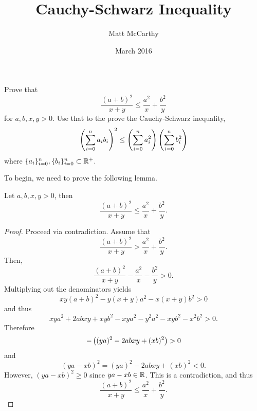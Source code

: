 \documentclass[notitlepage]{simple}
\author{Matt McCarthy}
\title{Cauchy-Schwarz Inequality}
\date{March 2016}
\begin{document}
	\maketitle
	\begin{thm*}
		Prove that
		\[
			\frac{(a+b)^2}{x+y}\leq \frac{a^2}{x}+\frac{b^2}{y}
		\]
		for $a,b,x,y>0$.
		Use that to the prove the Cauchy-Schwarz inequality,
		\[
			\left( \sum_{i=0}^n a_ib_i \right)^2 \leq \left( \sum_{i=0}^n a_i^2 \right)\left( \sum_{i=0}^n b_i^2 \right)
		\]
		where $\lbrace a_i \rbrace_{i=0}^n,\lbrace b_i \rbrace_{i=0}^n\subset\mathbb{R}^+$.
	\end{thm*}

	To begin, we need to prove the following lemma.
	\begin{lemma}
		Let $a,b,x,y>0$, then
		\[
			\frac{(a+b)^2}{x+y}\leq \frac{a^2}{x}+\frac{b^2}{y}.
		\]
	\end{lemma}
	\begin{proof}
		Proceed via contradiction.
		Assume that
		\[
			\frac{(a+b)^2}{x+y}>\frac{a^2}{x}+\frac{b^2}{y}.
		\]
		Then,
		\[
			\frac{(a+b)^2}{x+y}-\frac{a^2}{x}-\frac{b^2}{y}>0.
		\]
		Multiplying out the denominators yields
		\[
			xy(a+b)^2-y(x+y)a^2-x(x+y)b^2>0
		\]
		and thus
		\[
			xya^2+2abxy+xyb^2-xya^2-y^2a^2-xyb^2-x^2b^2>0.
		\]
		Therefore
		\[
			-\left( (ya)^2-2abxy+(xb)^2 \right)>0
		\]
		and
		\[
			(ya-xb)^2=(ya)^2-2abxy+(xb)^2 < 0.
		\]
		However, $(ya-xb)^2\geq 0$ since $ya-xb\in\mathbb{R}$.
		This is a contradiction, and thus
		\[
			\frac{(a+b)^2}{x+y}\leq \frac{a^2}{x}+\frac{b^2}{y}.
		\]
	\end{proof}
\end{document}
